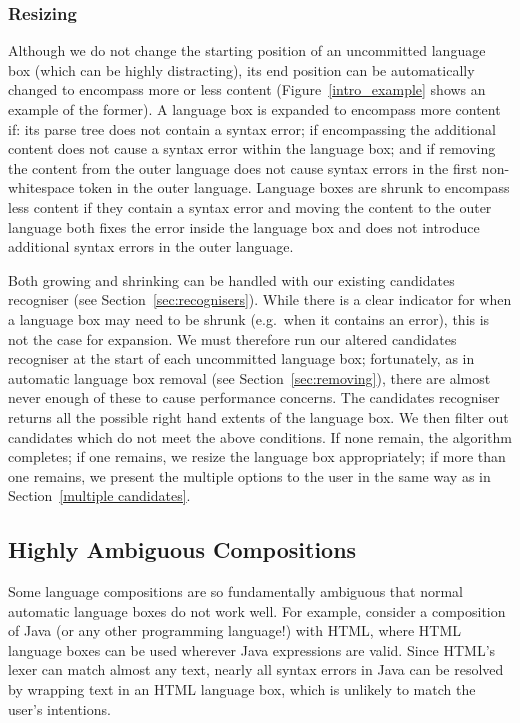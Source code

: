 \documentclass[sigplan,screen]{acmart}
\begin{document}
\subsubsection{Resizing}

Although we do not change the starting position of an uncommitted language box
(which can be highly distracting), its end position can be automatically
changed to encompass more or less content (Figure~\ref{intro_example} shows an
example of the former). A language box is expanded to encompass more content
if: its parse tree does not contain a syntax error; if encompassing the
additional content does not cause a syntax error within the language box; and
if removing the content from the outer language does not cause syntax errors in
the first non-whitespace token in the outer language.
Language boxes are shrunk to encompass less content if they
contain a syntax error and moving the content to the outer language both
fixes the error inside the language box and does not
introduce additional syntax errors in the outer language.

Both growing and shrinking can be handled with our existing
candidates recogniser (see Section~\ref{sec:recognisers}).
While there is a clear indicator for when a language box may need to be shrunk
(e.g.~when it contains an error), this is not the case for expansion. We
must therefore run our altered candidates recogniser at the start of
each uncommitted language box; fortunately, as in automatic language box
removal (see Section~\ref{sec:removing}), there are almost never enough of
these to cause performance concerns. The candidates recogniser
returns all the possible right hand extents of the language box. We then
filter out candidates which do not meet the above conditions. If none remain,
the algorithm completes; if one remains,
we resize the language box appropriately; if more than one remains, we present
the multiple options to the user in the same way as in Section~\ref{multiple candidates}.


\subsection{Highly Ambiguous Compositions}
\label{sec:highly ambiguous compositions}

Some language compositions are so fundamentally ambiguous that normal automatic
language boxes do not work well. For example, consider a composition of Java
(or any other programming language!) with HTML, where HTML language boxes can
be used wherever Java expressions are valid. Since HTML's lexer can match
almost any text, nearly all syntax errors in Java can be resolved by wrapping text in
an HTML language box, which is unlikely to match the user's intentions.
\end{document}
